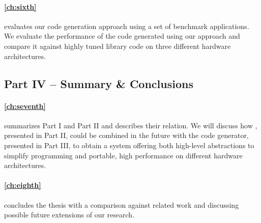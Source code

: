\paragraph{\autoref{ch:sixth}} evaluates our code generation approach using a set of benchmark applications.
We evaluate the performance of the code generated using our approach and compare it against highly tuned library code on three different hardware architectures.

\subsection*{Part IV -- Summary \& Conclusions}

\paragraph{\autoref{ch:seventh}} summarizes Part I and Part II and describes their relation.
We will discuss how \SkelCL, presented in Part II, could be combined in the future with the code generator, presented in Part III, to obtain a system offering both high-level abstractions to simplify programming and portable, high performance on different hardware architectures.

\paragraph{\autoref{ch:eighth}} concludes the thesis with a comparison against related work and discussing possible future extensions of our research.

